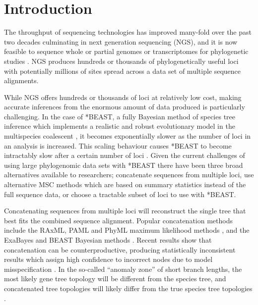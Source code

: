 \documentclass[nogrid]{MBE}%
\begin{document}
\maketitle

\section{Introduction}

The throughput of sequencing technologies has improved many-fold over the past
two decades culminating in next generation sequencing (NGS), and it is now
feasible to sequence whole or partial genomes or transcriptomes for phylogenetic
studies \citep{annurev-ecolsys-110512-135822}. NGS produces hundreds or
thousands of phylogenetically useful loci \citep[see for example][]{Blom20160181}
with potentially millions of sites spread across a data set of multiple
sequence alignments.

\newpage

While NGS offers hundreds or thousands of loci at relatively low cost, making
accurate inferences from the enormous amount of data produced is particularly
challenging. In the case of *BEAST, a fully Bayesian method of species tree
inference which implements a realistic and robust evolutionary model in the
multispecies coalescent \citep[MSC;][]{Degnan2009332, Heled01032010}, it becomes exponentially
slower as the number of loci in an analysis is increased. This scaling behaviour
causes *BEAST to become intractably slow after a certain number of loci
\citep[the exact number will depend on other parameters of the data set, see][]{Ogilvie01052016}.
Given the current challenges of using large phylogenomic data sets with *BEAST
there have been three broad alternatives available to researchers; concatenate
sequences from multiple loci, use alternative MSC methods which are based on
summary statistics instead of the full sequence data, or choose a tractable
subset of loci to use with *BEAST.

Concatenating sequences from multiple loci will reconstruct the single tree that
best fits the combined sequence alignment. Popular concatenation methods include
the RAxML, PAML and PhyML maximum likelihood methods \citep{Stamatakis01052014,
Yang01082007,Guindon01052010}, and the ExaBayes and BEAST Bayesian methods
\citep{Aberer01102014, Drummond2007}. Recent results show that concatenation
can be counterproductive, producing statistically inconsistent results which assign
high confidence to incorrect nodes due to model misspecification
\citep{NYAS:NYAS12747}. In the so-called ``anomaly zone'' of short branch
lengths, the most likely gene tree topology will be different from the species
tree, and concatenated tree topologies will likely differ from the true species
tree topologies \citep{journal.pgen.0020068, Kubatko01022007}.
\end{document}
